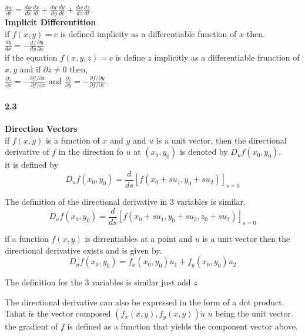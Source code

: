\documentclass[14pt]{extreport}
\begin{document}
$\frac{dw}{dt}= \frac{dw}{dx}\frac{dx}{dt}+\frac{dw}{dy}\frac{dy}{dt}+\frac{dw}{dz}\frac{dz}{dt}$\\

\textbf{Implicit Differentition}\\

if $f(x,y)=c$ is defined implicity as a differentiable function of $x$ then.\\
$\frac{dy}{dx} = -\frac{df}{dy}\frac{\partial y}{\partial x}$\\

if the equation $f(x,y,z) = c$ is define $z$ implicitly as a differentiable frunction of $x,y$ and if $\partial z \ne 0$ then,\\

$\frac{\partial z}{\partial x} = -\frac{\partial f/ \partial x}{\partial f / \partial z}$ and $\frac{\partial z}{\partial y} = -\frac{\partial f/ \partial y}{\partial f / \partial z}$.\\



\paragraph{2.3}\textbf{Direction Vectors}\\

if $f(x,y)$ is a function of $x$ and $y$ and $u$ is a unit vector, then the directional derivative of $f$ in the direction fo $u$ at $(x_0, y_0)$ is denoted by $D_uf(x_0, y_0)$.\\

it is defined by $$D_uf(x_0,y_0) = \frac{d}{ds}[f(x_0 + su_1, y_0+su_2)]_{s=0}$$

The definition of the directional derivative in 3 variables is similar.\\
 $$D_uf(x_0,y_0) = \frac{d}{ds}[f(x_0 + su_1, y_0+su_2, z_0 + su_3)]_{s=0}$$


if a function $f(x,y)$ is dirrentiables at a point and $u$ is a unit vector then the directional derivative exists and is given by.\\
$$ D_uf(x_0,y_0)=f_x(x_0,y_0)u_1 + f_y(x_0, y_0)u_2$$

The definition for the 3 variables is similar just add $z$

The directional derivative can also be expressed in the form of a dot product. Tahat is the vector composed $(f_x(x,y), f_y(x,y)) \dot u$ $u$ being the unit vector.\\

the gradient of $f$ is defined as a function that yields the component vector above.\\
\end{document}
